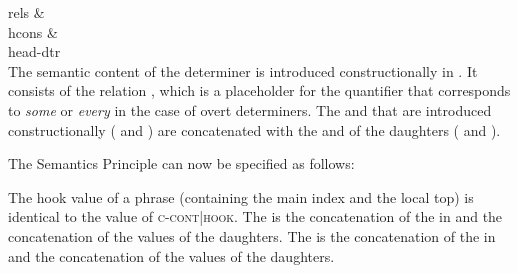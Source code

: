 \begin{exe}
\begin{xlist}[iv.]
\begin{exe}
\begin{xlist}[iv.]
\begin{exe}
\begin{xlist}[iv.]
{{                rels &   \\[10mm]
                hcons &  
              }\\
head-dtr  \\
}
\z
The semantic content of the determiner is introduced constructionally in \ccont. It consists of the
relation , which is a placeholder for the quantifier that corresponds to
\emph{some} or \emph{every} in the case of overt determiners. The \rels and \hconsvs that are
introduced constructionally ( and ) are concatenated with the \rels and \hconsvs of
the daughters ( and ).

The Semantics Principle can now be specified as follows:
\begin{principle}
The hook value of a phrase (containing the main index and the local top) is identical to the value of \textsc{c-cont|hook}. The
\relsv is the concatenation of the \relsv in \ccont and the concatenation of the \rels values of the
daughters. The \hconsv is the concatenation of the \hconsv in \ccont and the concatenation of the \hcons values of the
daughters. 
\end{principle}








\end{xlist}
\end{exe}
\end{xlist}
\end{exe}
\end{xlist}
\end{exe}
